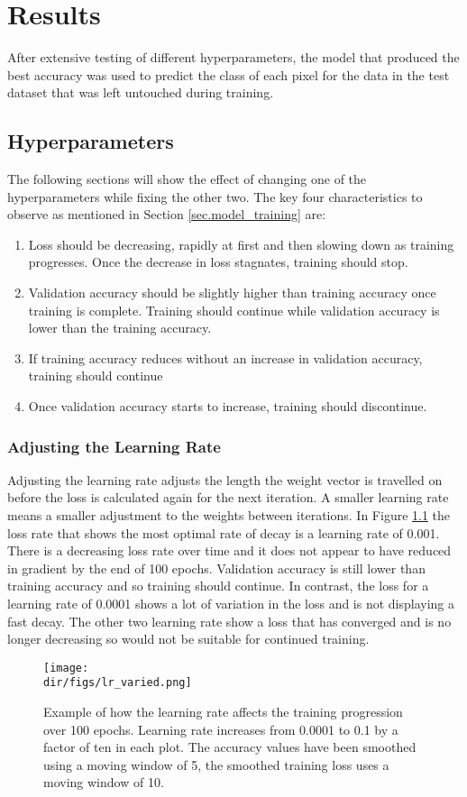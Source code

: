 \chapter{Results}
After extensive testing of different hyperparameters, the model that produced the best accuracy was used to predict the class of each pixel for the data in the test dataset that was left untouched during training. 
\section{Hyperparameters}
The following sections will show the effect of changing one of the hyperparameters while fixing the other two. The key four characteristics to observe as mentioned in Section \ref{sec.model_training} are:
\begin{enumerate}
    \item Loss should be decreasing, rapidly at first and then slowing down as training progresses. Once the decrease in loss stagnates, training should stop.
    \item Validation accuracy should be slightly higher than training accuracy once training is complete. Training should continue while validation accuracy is lower than the training accuracy.
    \item If training accuracy reduces without an increase in validation accuracy, training should continue
    \item Once validation accuracy starts to increase, training should discontinue. 
\end{enumerate}
\subsection{Adjusting the Learning Rate}
Adjusting the learning rate adjusts the length the weight vector is travelled on before the loss is calculated again for the next iteration. A smaller learning rate means a smaller adjustment to the weights between iterations. In Figure \ref{fig.lr_varied} the loss rate that shows the most optimal rate of decay is a learning rate of 0.001. There is a decreasing loss rate over time and it does not appear to have reduced in gradient by the end of 100 epochs. Validation accuracy is still lower than training accuracy and so training should continue. In contrast, the loss for a learning rate of 0.0001 shows a lot of variation in the loss and is not displaying a fast decay. The other two learning rate show a loss that has converged and is no longer decreasing so would not be suitable for continued training.
\begin{figure}[htpb]
    \centering
    \texttt{[image: \\dir/figs/lr\_varied.png]}
    \caption[Example of the affect of changing the learning rate]{Example of how the learning rate affects the training progression over 100 epochs. Learning rate increases from  0.0001 to 0.1 by a factor of ten in each plot. The accuracy values have been smoothed using a moving window of 5, the smoothed training loss uses a moving window of 10.}
    \label{fig.lr_varied}
\end{figure}

